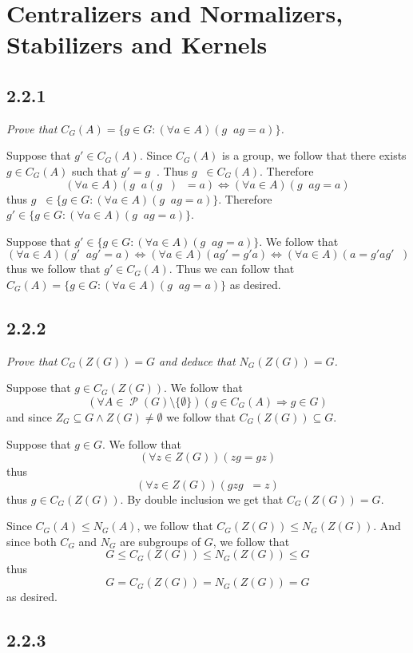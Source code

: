 \documentclass[11pt,oneside,titlepage]{book}
\DeclareMathOperator \pow {\mathcal {P}}
\DeclareMathOperator \inv {^{-1}}
\DeclareMathOperator \lra {\Leftrightarrow}
\DeclareMathOperator \ra {\Rightarrow}
\newcommand{\set}[1]{\{ #1 \}}
\begin{document}
\section{Centralizers and Normalizers, Stabilizers and Kernels}

\subsection*{2.2.1}

\textit{Prove that $C_G(A) = \set{g \in G: (\forall a \in A)(g \inv a g = a)}$.}

Suppose that $g' \in C_G(A)$. Since $C_G(A)$ is a group, we follow that there
exists $g \in C_G(A)$ such that $g' = g \inv$. Thus $g \inv \in C_G(A)$. Therefore
$$(\forall a \in A)(g \inv a (g\inv) \inv = a) \lra (\forall a \in A)(g \inv a g = a)$$
thus $g\inv \in \set{g \in G: (\forall a \in A)(g \inv a g = a)}$. Therefore
$g' \in \set{g \in G: (\forall a \in A)(g \inv a g = a)}$.

Suppose that $g' \in \set{g \in G: (\forall a \in A)(g \inv a g = a)}$.
We follow that
$$(\forall a \in A)(g' \inv a g' = a) \lra (\forall a \in A)( a g' = g' a) \lra
(\forall a \in A)( a  = g' a g'\inv)$$
thus we follow that $g' \in C_G(A)$. Thus we can follow that
$C_G(A) = \set{g \in G: (\forall a \in A)(g \inv a g = a)}$
as desired.


\subsection*{2.2.2}

\textit{Prove that $C_G(Z(G)) = G$ and deduce that $N_G(Z(G)) = G$.}

Suppose that $g \in C_G(Z(G))$. We follow that
$$(\forall A \in \pow(G) \setminus \set{\emptyset})(g \in C_G(A) \ra g \in G)$$
and since $Z_G \subseteq G \land Z(G) \neq \emptyset$ we follow that $C_G(Z(G)) \subseteq G$.

Suppose that $g \in G$. We follow that
$$(\forall z \in Z(G))(zg = gz)$$
thus
$$(\forall z \in Z(G))(g z g\inv = z)$$
thus $g \in C_G(Z(G))$. By double inclusion we get that $C_G(Z(G)) = G$.

Since $C_G(A) \leq N_G(A)$, we follow that $C_G(Z(G)) \leq N_G(Z(G))$. And since both
$C_G$ and $N_G$ are subgroups of $G$, we follow that
$$G \leq C_G(Z(G)) \leq N_G(Z(G)) \leq G$$
thus
$$G = C_G(Z(G)) = N_G(Z(G)) = G$$
as desired.

\subsection*{2.2.3}
\end{document}
